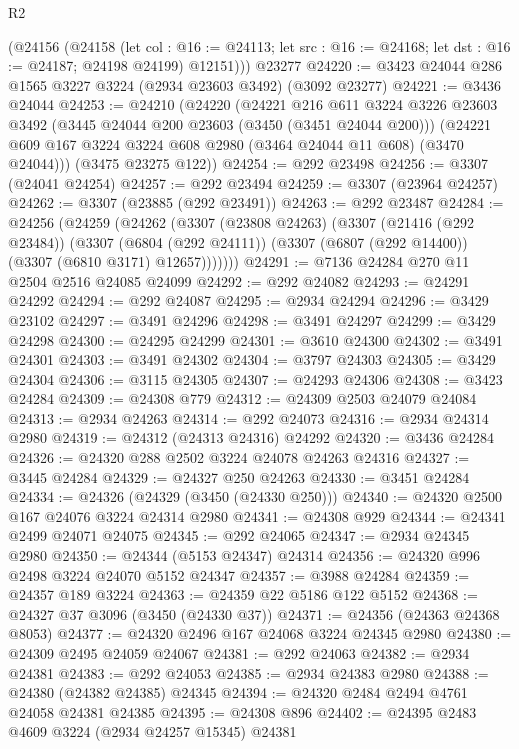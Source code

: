 \begin{lexlean}{R2}
\begin{coremodule}
      (@24156
        (@24158
          (let col : @16 := @24113; let src : @16 := @24168; let dst : @16 := @24187; @24198 @24199)
          @12151)))
    @23277
@24220 := @3423 @24044 @286 @1565 @3227 @3224 (@2934 @23603 @3492) (@3092 @23277)
@24221 := @3436 @24044
@24253 := @24210
    (@24220
      (@24221
        @216
        @611
        @3224
        @3226
        @23603
        @3492
        (@3445 @24044 @200 @23603 (@3450 (@3451 @24044 @200)))
        (@24221 @609 @167 @3224 @3224 @608 @2980 (@3464 @24044 @11 @608) (@3470 @24044)))
      (@3475 @23275 @122))
@24254 := @292 @23498
@24256 := @3307 (@24041 @24254)
@24257 := @292 @23494
@24259 := @3307 (@23964 @24257)
@24262 := @3307 (@23885 (@292 @23491))
@24263 := @292 @23487
@24284 := @24256
    (@24259
      (@24262
        (@3307
          (@23808 @24263)
          (@3307
            (@21416 (@292 @23484))
            (@3307
              (@6804 (@292 @24111))
              (@3307 (@6807 (@292 @14400)) (@3307 (@6810 @3171) @12657)))))))
@24291 := @7136 @24284 @270 @11 @2504 @2516 @24085 @24099
@24292 := @292 @24082
@24293 := @24291 @24292
@24294 := @292 @24087
@24295 := @2934 @24294
@24296 := @3429 @23102
@24297 := @3491 @24296
@24298 := @3491 @24297
@24299 := @3429 @24298
@24300 := @24295 @24299
@24301 := @3610 @24300
@24302 := @3491 @24301
@24303 := @3491 @24302
@24304 := @3797 @24303
@24305 := @3429 @24304
@24306 := @3115 @24305
@24307 := @24293 @24306
@24308 := @3423 @24284
@24309 := @24308 @779
@24312 := @24309 @2503 @24079 @24084
@24313 := @2934 @24263
@24314 := @292 @24073
@24316 := @2934 @24314 @2980
@24319 := @24312 (@24313 @24316) @24292
@24320 := @3436 @24284
@24326 := @24320 @288 @2502 @3224 @24078 @24263 @24316
@24327 := @3445 @24284
@24329 := @24327 @250 @24263
@24330 := @3451 @24284
@24334 := @24326 (@24329 (@3450 (@24330 @250)))
@24340 := @24320 @2500 @167 @24076 @3224 @24314 @2980
@24341 := @24308 @929
@24344 := @24341 @2499 @24071 @24075
@24345 := @292 @24065
@24347 := @2934 @24345 @2980
@24350 := @24344 (@5153 @24347) @24314
@24356 := @24320 @996 @2498 @3224 @24070 @5152 @24347
@24357 := @3988 @24284
@24359 := @24357 @189 @3224
@24363 := @24359 @22 @5186 @122 @5152
@24368 := @24327 @37 @3096 (@3450 (@24330 @37))
@24371 := @24356 (@24363 @24368 @8053)
@24377 := @24320 @2496 @167 @24068 @3224 @24345 @2980
@24380 := @24309 @2495 @24059 @24067
@24381 := @292 @24063
@24382 := @2934 @24381
@24383 := @292 @24053
@24385 := @2934 @24383 @2980
@24388 := @24380 (@24382 @24385) @24345
@24394 := @24320 @2484 @2494 @4761 @24058 @24381 @24385
@24395 := @24308 @896
@24402 := @24395 @2483 @4609 @3224 (@2934 @24257 @15345) @24381

\end{coremodule}
\end{lexlean}
